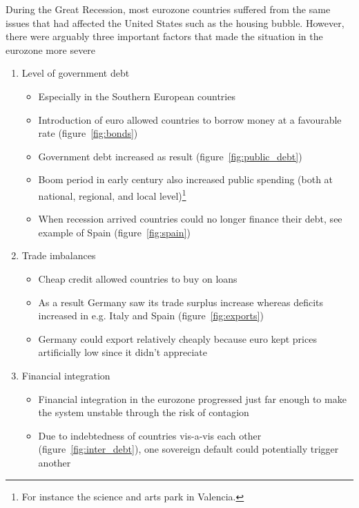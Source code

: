 \documentclass{tufte-handout}
\begin{document}
During the Great Recession, most eurozone countries suffered from the same issues that had affected the United States such as the housing bubble. 
However, there were arguably three important factors that made the situation in the eurozone more severe
\begin{enumerate}
  \item Level of government debt 
  \begin{itemize}
    \item Especially in the Southern European countries
    \item Introduction of euro allowed countries to borrow money at a favourable rate (figure~\ref{fig:bonds})
    \item Government debt increased as result (figure~\ref{fig:public_debt})
    \item Boom period in early century also increased public spending (both at national, regional, and local level)\footnote{For instance the science and arts park in Valencia.}
    \item When recession arrived countries could no longer finance their debt, see example of Spain (figure~\ref{fig:spain})        
  \end{itemize}
  \item Trade imbalances
  \begin{itemize}
    \item Cheap credit allowed countries to buy on loans
    \item As a result Germany saw its trade surplus increase whereas deficits increased in e.g. Italy and Spain (figure~\ref{fig:exports}) %
    \item Germany could export relatively cheaply because euro kept prices artificially low since it didn't appreciate     
  \end{itemize}
  \item Financial integration
  \begin{itemize}
    \item Financial integration in the eurozone progressed just far enough to make the system unstable through the risk of contagion
    \item Due to indebtedness of countries vis-a-vis each other (figure~\ref{fig:inter_debt}), one sovereign default could potentially trigger another
  \end{itemize}
\end{enumerate}{}
\end{document}
